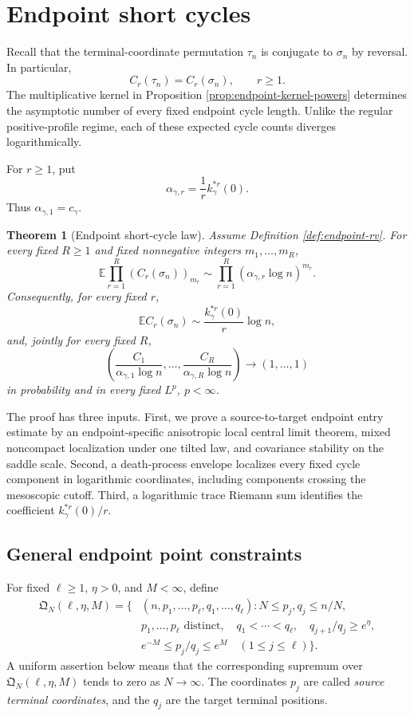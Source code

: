 \documentclass[11pt]{article}
\newtheorem{theorem}{Theorem}[section]
\theoremstyle{remark}
\newcommand{\Ee}{\mathbb E}
\begin{document}
\section{Endpoint short cycles}
\label{sec:endpoint-short-cycles}

Recall that the terminal-coordinate permutation $\tau_n$ is conjugate to
$\sigma_n$ by reversal.  In particular,
\[
        C_r(\tau_n)=C_r(\sigma_n),\qquad r\ge1.
\]
The multiplicative kernel in Proposition
\ref{prop:endpoint-kernel-powers} determines the asymptotic number of every
fixed endpoint cycle length.  Unlike the regular positive-profile regime, each
of these expected cycle counts diverges logarithmically.

For $r\ge1$, put
\[
        \alpha_{\gamma,r}=\frac1r k_\gamma^{*r}(0).
\]
Thus $\alpha_{\gamma,1}=c_\gamma$.

\begin{theorem}[Endpoint short-cycle law]
\label{thm:endpoint-short-cycles}
Assume Definition \ref{def:endpoint-rv}.  For every fixed $R\ge1$ and fixed
nonnegative integers $m_1,\ldots,m_R$,
\[
        \Ee\prod_{r=1}^R(C_r(\sigma_n))_{m_r}
        \sim\prod_{r=1}^R
        (\alpha_{\gamma,r}\log n)^{m_r}.
\]
Consequently, for every fixed $r$,
\[
        \Ee C_r(\sigma_n)
        \sim\frac{k_\gamma^{*r}(0)}r\log n,
\]
and, jointly for every fixed $R$,
\[
        \left(
        \frac{C_1}{\alpha_{\gamma,1}\log n},\ldots,
        \frac{C_R}{\alpha_{\gamma,R}\log n}
        \right)\longrightarrow(1,\ldots,1)
\]
in probability and in every fixed $L^p$, $p<\infty$.
\end{theorem}

The proof has three inputs.  First, we prove a source-to-target endpoint entry
estimate by an endpoint-specific anisotropic local central limit theorem,
mixed noncompact localization under one tilted law, and covariance stability
on the saddle scale.  Second, a death-process envelope localizes every fixed
cycle component in logarithmic coordinates, including components crossing the
mesoscopic cutoff.  Third, a logarithmic trace Riemann sum identifies the
coefficient $k_\gamma^{*r}(0)/r$.
\subsection{General endpoint point constraints}

For fixed $\ell\ge1$, $\eta>0$, and $M<\infty$, define
\[
\begin{aligned}
\mathfrak Q_N(\ell,\eta,M)=\bigl\{&(n,p_1,\ldots,p_\ell,
 q_1,\ldots,q_\ell):
 N\le p_j,q_j\le n/N,\\
& p_1,\ldots,p_\ell\text{ distinct},\quad
 q_1<\cdots<q_\ell,\quad
 q_{j+1}/q_j\ge e^\eta,\\
& e^{-M}\le p_j/q_j\le e^M\quad(1\le j\le\ell)
\bigr\}.
\end{aligned}
\tag{10.1}\label{eq:endpoint-point-admissible}
\]
A uniform assertion below means that the corresponding supremum over
$\mathfrak Q_N(\ell,\eta,M)$ tends to zero as $N\to\infty$.
The coordinates $p_j$ are called \emph{source terminal coordinates}, and the
$q_j$ are the target terminal positions.
\end{document}
